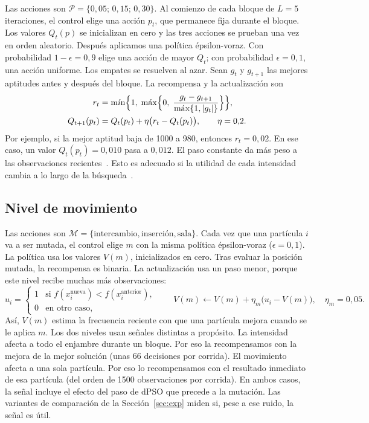\documentclass[10pt,a4paper]{article}
\DeclareMathOperator*{\maxop}{m\acute{a}x}
\DeclareMathOperator*{\minop}{m\acute{\imath}n}
\newcommand{\dc}{{,}}%
\begin{document}
Las acciones son $\mathcal{P}=\{0\dc05;\,0\dc15;\,0\dc30\}$. Al comienzo de cada bloque de $L=5$
iteraciones, el control elige una acción $p_t$, que permanece fija durante el bloque. Los
valores $Q_t(p)$ se inicializan en cero y las tres acciones se prueban una vez en orden
aleatorio. Después aplicamos una política épsilon-voraz. Con probabilidad $1-\epsilon=0\dc9$
elige una acción de mayor $Q_t$; con probabilidad $\epsilon=0\dc1$, una acción uniforme. Los
empates se resuelven al azar. Sean $g_t$ y $g_{t+1}$ las mejores aptitudes antes y después del
bloque. La recompensa y la actualización son
\begin{align}
r_t &= \minop\Bigl\{1,\;\maxop\Bigl\{0,\;\frac{g_t-g_{t+1}}{\maxop\{1,|g_t|\}}\Bigr\}\Bigr\},
\label{eq:r}\\
Q_{t+1}(p_t) &= Q_t(p_t)+\eta\bigl(r_t-Q_t(p_t)\bigr),\qquad \eta=0\dc2 .
\label{eq:q}
\end{align}
Por ejemplo, si la mejor aptitud baja de 1000 a 980, entonces $r_t=0\dc02$. En ese caso, un
valor $Q_t(p_t)=0\dc010$ pasa a $0\dc012$. El paso constante da más peso a las observaciones
recientes~\cite{sutton2018}. Esto es adecuado si la utilidad de cada intensidad cambia a lo
largo de la búsqueda~\cite{fialho2010}.

\subsection{Nivel de movimiento}

Las acciones son $\mathcal{M}=\{\text{intercambio},\text{inserción},\text{sala}\}$. Cada vez que
una partícula $i$ va a ser mutada, el control elige $m$ con la misma política épsilon-voraz
($\epsilon=0\dc1$). La política usa los valores $V(m)$, inicializados en cero. Tras evaluar la
posición mutada, la recompensa es binaria. La actualización usa un paso menor, porque este
nivel recibe muchas más observaciones:
\begin{equation}
u_i=\begin{cases}1 & \text{si } f(x_i^{\text{nueva}})<f(x_i^{\text{anterior}}),\\ 0 & \text{en otro caso,}\end{cases}
\qquad V(m)\leftarrow V(m)+\eta_m\bigl(u_i-V(m)\bigr),\quad \eta_m=0\dc05 .
\label{eq:v}
\end{equation}
Así, $V(m)$ estima la frecuencia reciente con que una partícula mejora cuando se le aplica $m$.
Los dos niveles usan señales distintas a propósito. La intensidad afecta a todo el enjambre
durante un bloque. Por eso la recompensamos con la mejora de la mejor solución (unas 66
decisiones por corrida). El movimiento afecta a una sola partícula. Por eso lo recompensamos
con el resultado inmediato de esa partícula (del orden de 1500 observaciones por corrida). En
ambos casos, la señal incluye el efecto del paso de dPSO que precede a la mutación. Las
variantes de comparación de la Sección~\ref{sec:exp} miden si, pese a ese ruido, la señal es
útil.
\end{document}
